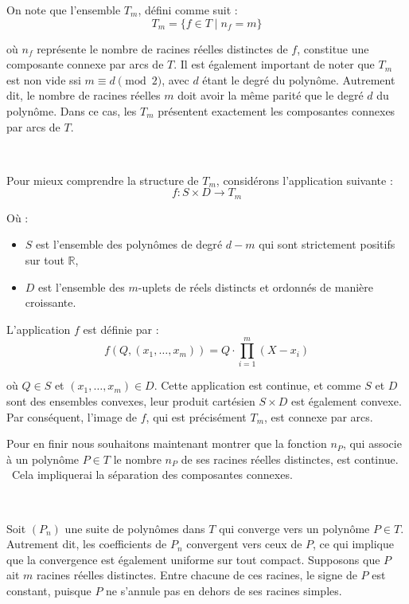 On note que l'ensemble $T_m$, d{\'e}fini comme suit :
\[ T_m =\{f \in T \mid n_f = m\} \]


o{\`u} $n_f$ repr{\'e}sente le nombre de racines r{\'e}elles distinctes de
$f$, constitue une composante connexe par arcs de $T$. Il est {\'e}galement
important de noter que $T_m$ est non vide ssi $m \equiv d \pmod{2}$, avec $d$
{\'e}tant le degr{\'e} du polyn{\^o}me. Autrement dit, le nombre de racines
r{\'e}elles $m$ doit avoir la m{\^e}me parit{\'e} que le degr{\'e} $d$ du
polyn{\^o}me. Dans ce cas, les $T_m$ pr{\'e}sentent exactement les composantes
connexes par arcs de $T$.

\


Pour mieux comprendre la structure de $T_m$, consid{\'e}rons l'application
suivante :
\[ f : S \times D \to T_m \]


O{\`u} :
\begin{itemize}
  \item $S$ est l'ensemble des polyn{\^o}mes de degr{\'e} $d - m$ qui sont
  strictement positifs sur tout $\mathbb{R}$,
  
  \item $D$ est l'ensemble des $m$-uplets de r{\'e}els distincts et
  ordonn{\'e}s de mani{\`e}re croissante.
\end{itemize}


L'application $f$ est d{\'e}finie par :
\[ f (Q, (x_1, \ldots, x_m)) = Q \cdot \prod_{i = 1}^m (X - x_i) \]


o{\`u} $Q \in S$ et $(x_1, \ldots, x_m) \in D$. Cette application est
continue, et comme $S$ et $D$ sont des ensembles convexes, leur produit
cart{\'e}sien $S \times D$ est {\'e}galement convexe. Par cons{\'e}quent,
l'image de $f$, qui est pr{\'e}cis{\'e}ment $T_m$, est connexe par arcs.

Pour en finir nous souhaitons maintenant montrer que la fonction $n_P$, qui
associe {\`a} un polyn{\^o}me $P \in T$ le nombre $n_P$ de ses racines
r{\'e}elles distinctes, est continue. \ Cela impliquerai la s{\'e}paration des
composantes connexes.

\


Soit $(P_n)$ une suite de polyn{\^o}mes dans $T$ qui converge vers un
polyn{\^o}me $P \in T$. Autrement dit, les coefficients de $P_n$ convergent
vers ceux de $P$, ce qui implique que la convergence est {\'e}galement
uniforme sur tout compact. Supposons que $P$ ait $m$ racines r{\'e}elles
distinctes. Entre chacune de ces racines, le signe de $P$ est constant,
puisque $P$ ne s'annule pas en dehors de ses racines simples.

